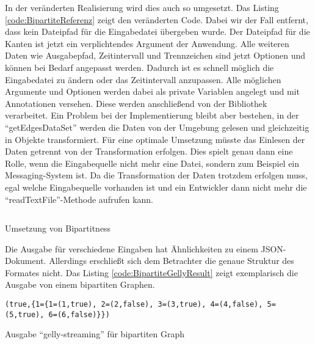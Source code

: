 In der veränderten Realisierung wird dies auch so umgesetzt. Das Listing \ref{code:BipartiteReferenz}
zeigt den veränderten Code. Dabei wir der Fall entfernt, dass kein Dateipfad
für die Eingabedatei übergeben wurde. Der Dateipfad für die Kanten ist jetzt ein
verplichtendes Argument der Anwendung. Alle weiteren Daten wie Ausgabepfad,
Zeitintervall und Trennzeichen sind jetzt Optionen und können bei Bedarf angepasst
werden. Dadurch ist es schnell möglich die Eingabedatei zu ändern oder das
Zeitintervall anzupassen. Alle möglichen Argumente und Optionen werden dabei als
private Variablen angelegt und mit Annotationen versehen. Diese werden anschließend
von der Bibliothek verarbeitet.  Ein Problem bei der Implementierung bleibt aber
bestehen, in der \enquote{getEdgesDataSet} werden die Daten von der Umgebung
gelesen und gleichzeitig in Objekte transformiert. Für eine optimale Umsetzung
müsste das Einlesen der Daten getrennt von der Transformation erfolgen.
Dies spielt genau dann eine Rolle, wenn die Eingabequelle nicht mehr eine Datei,
sondern zum Beispiel ein Messaging-System ist. Da die Transformation der
Daten trotzdem erfolgen muss, egal welche Eingabequelle vorhanden ist und ein
Entwickler dann nicht mehr die \enquote{readTextFile}-Methode aufrufen kann.

\begin{listing}
\inputminted[breaklines=true]{java}{../material/code/GellyStreamingResult.java}
\caption{Umsetzung von Bipartitness}
\label{code:BipartiteReferenz}
\end{listing}

Die Ausgabe für verschiedene Eingaben hat Ähnlichkeiten zu einem
\gls{JSON}-Dokument. Allerdings erschließt sich dem Betrachter die genaue
Struktur des Formates nicht. Das Listing \ref{code:BipartiteGellyResult} zeigt
exemplarisch die Ausgabe von einem bipartiten Graphen.

\begin{listing}
\begin{verbatim}
(true,{1={1=(1,true), 2=(2,false), 3=(3,true), 4=(4,false), 5=(5,true), 6=(6,false)}})
\end{verbatim}
\caption{Ausgabe \enquote{gelly-streaming} für bipartiten Graph}
\label{code:BipartiteGellyResult}
\end{listing}

